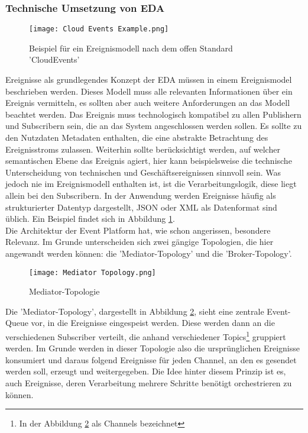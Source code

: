 \subsubsection*{Technische Umsetzung von \ac{EDA}}
\label{teda}
\begin{figure}[H]
  \centering
  \texttt{[image: Cloud Events Example.png]}
  \caption[Beispiel für ein Ereignismodell nach dem offen Standard 'CloudEvents']{Beispiel für ein Ereignismodell nach dem offen Standard 'CloudEvents' \footnotemark}
  \label{cloudeventslabel}
\end{figure}
Ereignisse als grundlegendes Konzept der \ac{EDA} müssen in einem Ereignismodel beschrieben werden. Dieses Modell muss alle relevanten Informationen über ein Ereignis vermitteln, es sollten aber auch weitere Anforderungen an das Modell beachtet werden. Das Ereignis muss technologisch kompatibel zu allen Publishern und Subscribern sein, die an das System angeschlossen werden sollen. Es sollte zu den Nutzdaten Metadaten enthalten, die eine abstrakte Betrachtung des Ereignisstroms zulassen. Weiterhin sollte berücksichtigt werden, auf welcher semantischen Ebene das Ereignis agiert, hier kann beispielsweise die technische Unterscheidung von technischen und Geschäftsereignissen sinnvoll sein. Was jedoch nie im Ereignismodell enthalten ist, ist die Verarbeitungslogik, diese liegt allein bei den Subscribern. \cite[Vgl. ][S. 95]{EDA2010} In der Anwendung werden Ereignisse häufig als strukturierter Datentyp dargestellt, JSON oder XML als Datenformat sind üblich. Ein Beispiel findet sich in Abbildung \ref{cloudeventslabel}.\\
Die Architektur der Event Platform hat, wie schon angerissen, besondere Relevanz. Im Grunde unterscheiden sich zwei gängige Topologien, die hier angewandt werden können: die 'Mediator-Topology' und die 'Broker-Topology'.\\
\begin{figure}
  \centering
  \texttt{[image: Mediator Topology.png]}
  \caption[Mediator-Topologie]{Mediator-Topologie \cite[][]{wickramarachchi_2017_event}}
  \label{mediatortop}
\end{figure}
Die 'Mediator-Topology', dargestellt in Abbildung \ref{mediatortop}, sieht eine zentrale Event-Queue vor, in die Ereignisse eingespeist werden. Diese werden dann an die verschiedenen Subscriber verteilt, die anhand verschiedener Topics\footnote{In der Abbildung \ref{mediatortop} als Channels bezeichnet} gruppiert werden. Im Grunde werden in dieser Topologie also die ursprünglichen Ereignisse konsumiert und daraus folgend Ereignisse für jeden Channel, an den es gesendet werden soll, erzeugt und weitergegeben. Die Idee hinter diesem Prinzip ist es, auch Ereignisse, deren Verarbeitung mehrere Schritte benötigt orchestrieren zu können. \cite[Vgl. ][]{wickramarachchi_2017_event} \\

